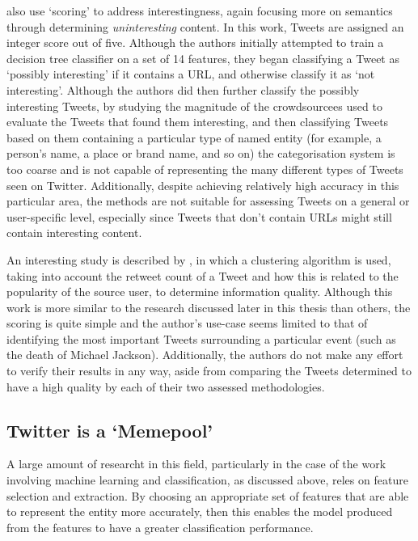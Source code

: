 \citet{alonso10} also use `scoring' to address interestingness, again focusing more on semantics through determining \textit{uninteresting} content. In this work, Tweets are assigned an integer score out of five. Although the authors initially attempted to train a decision tree classifier on a set of 14 features, they began classifying a Tweet as `possibly interesting' if it contains a URL, and otherwise classify it as `not interesting'. Although the authors did then further classify the possibly interesting Tweets, by studying the magnitude of the crowdsourcees used to evaluate the Tweets that found them interesting, and then classifying Tweets based on them containing a particular type of named entity (for example, a person's name, a place or brand name, and so on) the categorisation system is too coarse and is not capable of representing the many different types of Tweets seen on Twitter. Additionally, despite achieving relatively high accuracy in this particular area, the methods are not suitable for assessing Tweets on a general or user-specific level, especially since Tweets that don't contain URLs might still contain interesting content.

An interesting study is described by \citet{lauw10}, in which a clustering algorithm is used, taking into account the retweet count of a Tweet and how this is related to the popularity of the source user, to determine information quality. Although this work is more similar to the research discussed later in this thesis than others, the scoring is quite simple and the author's use-case seems limited to that of identifying the most important Tweets surrounding a particular event (such as the death of Michael Jackson). Additionally, the authors do not make any effort to verify their results in any way, aside from comparing the Tweets determined to have a high quality by each of their two assessed methodologies.



\subsection{Twitter is a `Memepool'}
A large amount of researcht in this field, particularly in the case of the work involving machine learning and classification, as discussed above, reles on feature selection and extraction. By choosing an appropriate set of features that are able to represent the entity more accurately, then this enables the model produced from the features to have a greater classification performance.  

